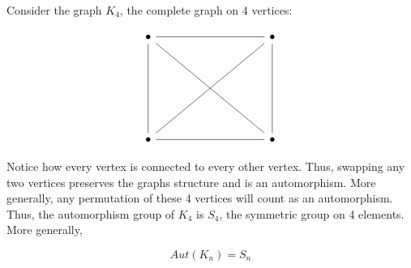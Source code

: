 \begin{example}
    Consider the graph $K_4$, the complete graph on 4 vertices:

    \[\begin{tikzcd}
        \bullet &&&& \bullet \\
        \\
        \\
        {} \\
        \bullet &&&& \bullet
        \arrow[no head, from=1-1, to=5-1]
        \arrow[no head, from=1-1, to=5-5]
        \arrow[no head, from=1-5, to=1-1]
        \arrow[no head, from=1-5, to=5-1]
        \arrow[no head, from=5-1, to=5-5]
        \arrow[no head, from=5-5, to=1-5]
    \end{tikzcd}\]

    Notice how every vertex is connected to every other vertex. Thus, swapping any two vertices preserves the graphs structure and is an automorphism. More generally, any permutation of these 4 vertices will count as an automorphism. Thus, the automorphism group of $K_4$ is $S_4$, the symmetric group on 4 elements. More generally, 

    \[Aut(K_n) = S_n\]
\end{example}

